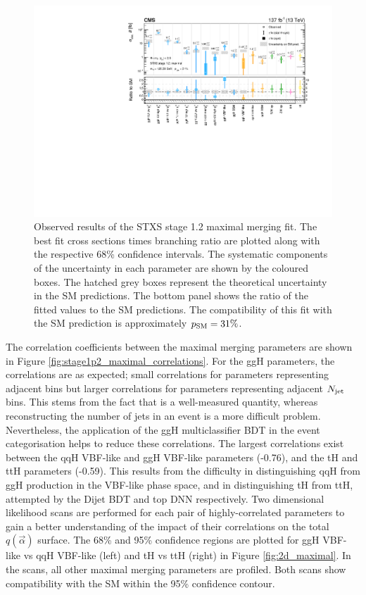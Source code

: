 \begin{figure}[htbp]
  \centering
  \includegraphics[width=1\textwidth]{Figures/hgg_results/stage1p2_maximal_summary.pdf}
  \caption[Results of the STXS stage 1.2 maximal merging fit]
  {
    Observed results of the STXS stage 1.2 maximal merging fit. The best fit cross sections times branching ratio are plotted along with the respective 68\% confidence intervals. The systematic components of the uncertainty in each parameter are shown by the coloured boxes. The hatched grey boxes represent the theoretical uncertainty in the SM predictions. The bottom panel shows the ratio of the fitted values to the SM predictions. The compatibility of this fit with the SM prediction is approximately $p_{\rm{SM}}=31\%$. 
  }
  \label{fig:stage1p2_maximal_results}
\end{figure}

The correlation coefficients between the maximal merging parameters are shown in Figure \ref{fig:stage1p2_maximal_correlations}. For the ggH parameters, the correlations are as expected; small correlations for parameters representing adjacent \ptH bins but larger correlations for parameters representing adjacent $N_{\rm{jet}}$ bins. This stems from the fact that \ptgg is a well-measured quantity, whereas reconstructing the number of jets in an event is a more difficult problem. Nevertheless, the application of the ggH multiclassifier BDT in the event categorisation helps to reduce these correlations. The largest correlations exist between the qqH VBF-like and ggH VBF-like parameters (-0.76), and the tH and ttH parameters (-0.59). This results from the difficulty in distinguishing qqH from ggH production in the VBF-like phase space, and in distinguishing tH from ttH, attempted by the Dijet BDT and top DNN respectively. Two dimensional likelihood scans are performed for each pair of highly-correlated parameters to gain a better understanding of the impact of their correlations on the total $q(\vec{\alpha})$ surface. The 68\% and 95\% confidence regions are plotted for ggH VBF-like vs qqH VBF-like (left) and tH vs ttH (right) in Figure \ref{fig:2d_maximal}. In the scans, all other maximal merging parameters are profiled. Both scans show compatibility with the SM within the 95\% confidence contour.

